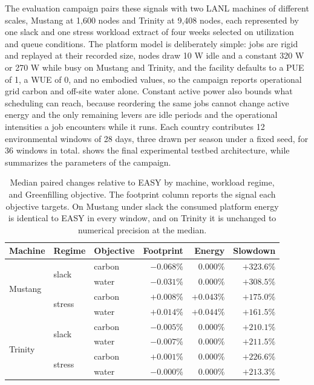 The evaluation campaign pairs these signals with two LANL machines of different scales, Mustang at 1,600 nodes and Trinity at 9,408 nodes, each represented by one slack and one stress workload extract of four weeks selected on utilization and queue conditions. The platform model is deliberately simple: jobs are rigid and replayed at their recorded size, nodes draw 10 W idle and a constant 320 W or 270 W while busy on Mustang and Trinity, and the facility defaults to a PUE of 1, a WUE of 0, and no embodied values, so the campaign reports operational grid carbon and off-site water alone. Constant active power also bounds what scheduling can reach, because reordering the same jobs cannot change active energy and the only remaining levers are idle periods and the operational intensities a job encounters while it runs. Each country contributes 12 environmental windows of 28 days, three drawn per season under a fixed seed, for 36 windows in total.  shows the final experimental testbed architecture, while  summarizes the parameters of the campaign.

\begin{table}
\centering
\caption{Median paired changes relative to EASY by machine, workload regime, and Greenfilling objective. The footprint column reports the signal each objective targets. On Mustang under slack the consumed platform energy is identical to EASY in every window, and on Trinity it is unchanged to numerical precision at the median.}
\label{tab:greenfilling-breakdown}
\begin{tabular}{lllrrr}
\toprule
Machine & Regime & Objective & Footprint & Energy & Slowdown \\
\midrule
\multirow[t]{4}{*}{Mustang} & \multirow[t]{2}{*}{slack} & carbon & $-0.068\%$ & $0.000\%$ & $+323.6\%$ \\
 & & water & $-0.031\%$ & $0.000\%$ & $+308.5\%$ \\
 & \multirow[t]{2}{*}{stress} & carbon & $+0.008\%$ & $+0.043\%$ & $+175.0\%$ \\
 & & water & $+0.014\%$ & $+0.044\%$ & $+161.5\%$ \\
 \midrule
\multirow[t]{4}{*}{Trinity} & \multirow[t]{2}{*}{slack} & carbon & $-0.005\%$ & $0.000\%$ & $+210.1\%$ \\
 & & water & $-0.007\%$ & $0.000\%$ & $+211.5\%$ \\
 & \multirow[t]{2}{*}{stress} & carbon & $+0.001\%$ & $0.000\%$ & $+226.6\%$ \\
 & & water & $-0.000\%$ & $0.000\%$ & $+213.3\%$ \\
\bottomrule
\end{tabular}
\end{table}

